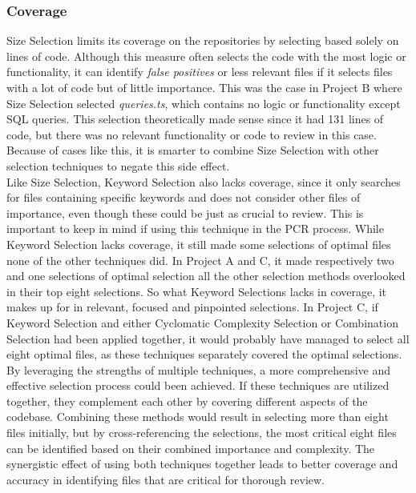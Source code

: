 \subsubsection{Coverage}
Size Selection limits its coverage on the repositories by selecting based solely on lines of code. Although this measure often selects the code with the most logic or functionality, it can identify \textit{false positives} or less relevant files if it selects files with a lot of code but of little importance. This was the case in Project B where Size Selection selected \textit{queries.ts}, which contains no logic or functionality except SQL queries. This selection theoretically made sense since it had 131 lines of code, but there was no relevant functionality or code to review in this case. Because of cases like this, it is smarter to combine Size Selection with other selection techniques to negate this side effect. \\

Like Size Selection, Keyword Selection also lacks coverage, since it only searches for files containing specific keywords and does not consider other files of importance, even though these could be just as crucial to review. This is important to keep in mind if using this technique in the PCR process. While Keyword Selection lacks coverage, it still made some selections of optimal files none of the other techniques did. In Project A and C, it made respectively two and one selections of optimal selection all the other selection methods overlooked in their top eight selections. So what Keyword Selections lacks in coverage, it makes up for in relevant, focused and pinpointed selections. In Project C, if Keyword Selection and either Cyclomatic Complexity Selection or Combination Selection had been applied together, it would probably have managed to select all eight optimal files, as these techniques separately covered the optimal selections. By leveraging the strengths of multiple techniques, a more comprehensive and effective selection process could been achieved. If these techniques are utilized together, they complement each other by covering different aspects of the codebase. Combining these methods would result in selecting more than eight files initially, but by cross-referencing the selections, the most critical eight files can be identified based on their combined importance and complexity. The synergistic effect of using both techniques together leads to better coverage and accuracy in identifying files that are critical for thorough review. \\


